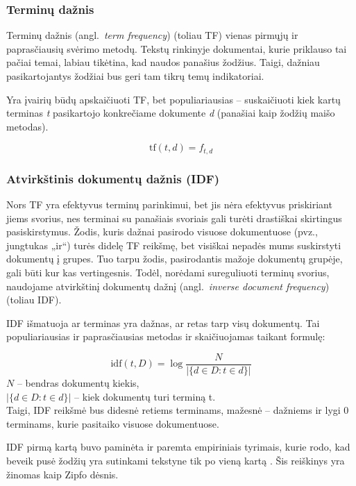 \documentclass{VUMIFInfKursinis}
\newcommand{\ltang}[2]{#1 (angl.\  \textit{#2}) }
\begin{document}
\subsubsection{Terminų dažnis}

\ltang{Terminų dažnis}{term frequency} (toliau TF) vienas pirmųjų
ir paprasčiausių svėrimo metodų. Tekstų rinkinyje dokumentai, kurie
priklauso tai pačiai temai, labiau tikėtina, kad naudos panašius
žodžius. Taigi, dažniau pasikartojantys žodžiai bus geri tam tikrų temų
indikatoriai.

Yra įvairių būdų apskaičiuoti TF, bet populiariausias – suskaičiuoti
kiek kartų terminas \textit{t} pasikartojo konkrečiame dokumente \textit{d}
(panašiai kaip žodžių maišo metodas).

$$\mathrm{tf} (t,d)=f_{t,d}$$





\subsubsection{Atvirkštinis dokumentų dažnis
(IDF)}

Nors TF yra efektyvus terminų parinkimui, bet jis nėra efektyvus
priskiriant jiems svorius, nes terminai su panašiais svoriais gali
turėti drastiškai skirtingus pasiskirstymus. Žodis, kuris dažnai
pasirodo visuose dokumentuose (pvz., jungtukas „ir“) turės didelę TF
reikšmę, bet visiškai nepadės mums suskirstyti dokumentų į grupes. Tuo
tarpu žodis, pasirodantis mažoje dokumentų grupėje, gali būti kur kas
vertingesnis. Todėl, norėdami sureguliuoti terminų svorius, naudojame
\ltang{atvirkštinį dokumentų dažnį}{inverse document frequency}
(toliau IDF).

IDF išmatuoja ar terminas yra dažnas, ar retas tarp visų dokumentų. Tai
populiariausias ir paprasčiausias metodas ir skaičiuojamas taikant
formulę:

$$\mathrm{idf}(t, D) =  \log \frac{N}{|\{d \in D: t \in d\}|}$$
$N$ – bendras dokumentų kiekis,\\
$|\{d \in D: t \in d\}|$ – kiek dokumentų turi terminą t.\\
Taigi, IDF reikšmė bus didesnė retiems terminams, mažesnė – dažniems ir
lygi 0 terminams, kurie pasitaiko visuose dokumentuose.

IDF pirmą kartą buvo paminėta \cite{sparck1972statistical} ir
paremta empiriniais tyrimais, kurie rodo, kad beveik pusė žodžių yra
sutinkami tekstyne tik po vieną kartą \cite{piaseckiene2014statistiniai}. Šis
reiškinys yra žinomas kaip Zipfo dėsnis.
\end{document}

